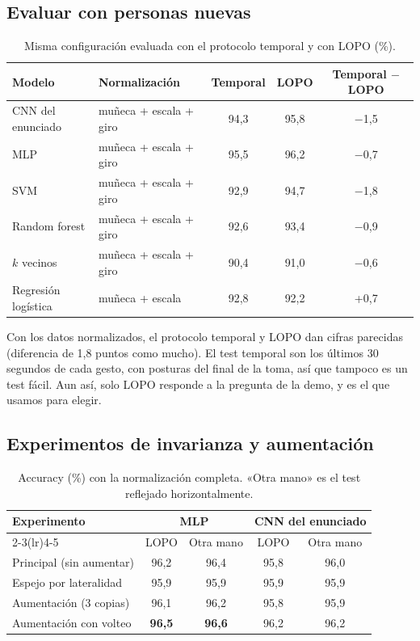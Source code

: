 \documentclass[11pt,a4paper]{article}
\newcommand{\mejor}[1]{\textbf{#1}}
\begin{document}
\subsection{Evaluar con personas nuevas}

\begin{table}[H]
\centering\small
\begin{tabular}{llccc}
\toprule
Modelo & Normalización & Temporal & LOPO & Temporal $-$ LOPO \\
\midrule
CNN del enunciado & muñeca + escala + giro & 94,3 & 95,8 & $-$1,5 \\
MLP & muñeca + escala + giro & 95,5 & 96,2 & $-$0,7 \\
SVM & muñeca + escala + giro & 92,9 & 94,7 & $-$1,8 \\
Random forest & muñeca + escala + giro & 92,6 & 93,4 & $-$0,9 \\
$k$ vecinos & muñeca + escala + giro & 90,4 & 91,0 & $-$0,6 \\
Regresión logística & muñeca + escala & 92,8 & 92,2 & +0,7 \\
\bottomrule
\end{tabular}
\caption{Misma configuración evaluada con el protocolo temporal y con LOPO (\%).}
\end{table}

Con los datos normalizados, el protocolo temporal y LOPO dan cifras parecidas (diferencia de 1,8 puntos como mucho).
El test temporal son los últimos 30 segundos de cada gesto, con posturas del final de la toma, así que tampoco es un
test fácil. Aun así, solo LOPO responde a la pregunta de la demo, y es el que usamos
para elegir.

\subsection{Experimentos de invarianza y aumentación}

\begin{table}[H]
\centering\small
\begin{tabular}{lcccc}
\toprule
\multirow{2}{*}{Experimento} & \multicolumn{2}{c}{MLP} & \multicolumn{2}{c}{CNN del enunciado} \\
\cmidrule(lr){2-3}\cmidrule(lr){4-5}
 & LOPO & Otra mano & LOPO & Otra mano \\
\midrule
Principal (sin aumentar) & 96,2 & 96,4 & 95,8 & 96,0 \\
Espejo por lateralidad & 95,9 & 95,9 & 95,9 & 95,9 \\
Aumentación (3 copias) & 96,1 & 96,2 & 95,8 & 95,9 \\
Aumentación con volteo & \mejor{96,5} & \mejor{96,6} & 96,2 & 96,2 \\
\bottomrule
\end{tabular}
\caption{Accuracy (\%) con la normalización completa. «Otra mano» es el test reflejado horizontalmente.}
\end{table}
\end{document}
